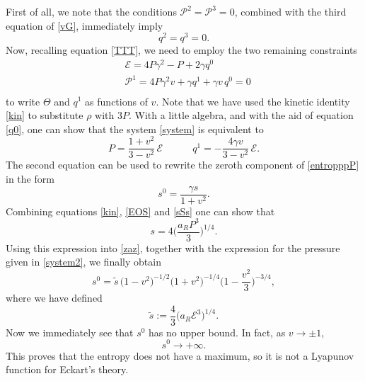 \documentclass[a4paper, amsfonts, amssymb, amsmath, reprint, showkeys, nofootinbib, twoside]{revtex4-1}
\newcommand{\spc}{\quad \quad \quad}
\begin{document}
First of all, we note that the conditions $\mathcal{P}^2=\mathcal{P}^3=0$, combined with the third equation of \eqref{vG}, immediately imply
\begin{equation}
q^2 = q^3 =0.
\end{equation}
Now, recalling equation \eqref{TTT}, we need to employ the two remaining constraints
\begin{equation}\label{system}
\begin{split}
& \mathcal{E} = 4P \gamma^2 -P + 2\gamma q^0  \\
& \mathcal{P}^1 = 4P\gamma^2 v +\gamma q^1 + \gamma v \, q^0 =0 \\
\end{split}
\end{equation}
to write $\Theta$ and $q^1$ as functions of $v$. Note that we have used the kinetic identity \eqref{kin} to substitute $\rho$ with $3P$. With a little algebra, and with the aid of equation \eqref{q0}, one can show that the system \eqref{system} is equivalent to
\begin{equation}\label{system2}
 P = \dfrac{1+v^2}{3-v^2} \, \mathcal{E}  \spc q^1 = -\dfrac{4\gamma v}{3-v^2} \, \mathcal{E}. 
\end{equation}
The second equation can be used to rewrite the zeroth component of \eqref{entropppP} in the form
\begin{equation}\label{zaz}
s^0 = \dfrac{\gamma s}{1+v^2}.
\end{equation} 
Combining equations \eqref{kin}, \eqref{EOS} and \eqref{sSs} one can show that
\begin{equation}
s = 4 \bigg( \dfrac{a_R P^3}{3} \bigg)^{1/4}.
\end{equation}
Using this expression into \eqref{zaz}, together with the expression for the pressure given in \eqref{system2}, we finally obtain
\begin{equation}\label{gringo}
s^0 = \tilde{s} \, \bigg( 1-v^2 \bigg)^{-1/2} \bigg( 1+v^2 \bigg)^{-1/4} \bigg( 1- \dfrac{v^2}{3} \bigg)^{-3/4} ,
\end{equation}
where we have defined
\begin{equation}
\tilde{s}:= \dfrac{4}{3} \big(a_R \mathcal{E}^3 \big)^{1/4}.
\end{equation}
Now we immediately see that $s^0$ has no upper bound. In fact, as $v \rightarrow \pm 1$,
\begin{equation}
s^0 \longrightarrow +\infty.
\end{equation}
This proves that the entropy does not have a maximum, so it is not a Lyapunov function for Eckart's theory.
\end{document}
